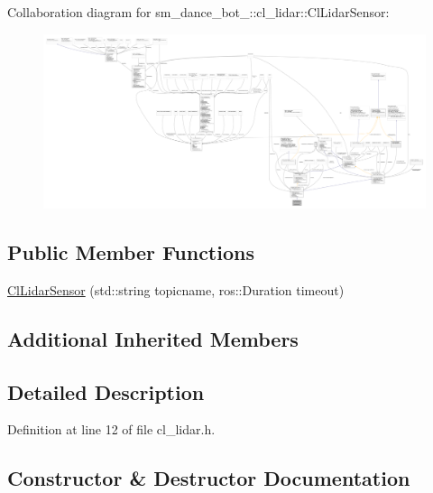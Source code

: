 Collaboration diagram for sm\+\_\+dance\+\_\+bot\+\_\+:\+:cl\+\_\+lidar\+:\+:Cl\+Lidar\+Sensor\+:
\nopagebreak
\begin{figure}[H]
\begin{center}
\leavevmode
\includegraphics[width=350pt]{classsm__dance__bot__2_1_1cl__lidar_1_1ClLidarSensor__coll__graph}
\end{center}
\end{figure}
\subsection*{Public Member Functions}
\begin{DoxyCompactItemize}
\item 
\hyperlink{classsm__dance__bot__2_1_1cl__lidar_1_1ClLidarSensor_a6529101df84955056e5497bdbceedc69}{Cl\+Lidar\+Sensor} (std\+::string topicname, ros\+::\+Duration timeout)
\end{DoxyCompactItemize}
\subsection*{Additional Inherited Members}


\subsection{Detailed Description}


Definition at line 12 of file cl\+\_\+lidar.\+h.



\subsection{Constructor \& Destructor Documentation}
